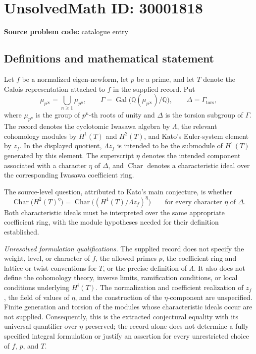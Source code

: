 \documentclass[11pt]{article}
\newcommand{\Q}{\mathbb{Q}}
\begin{document}
\section*{UnsolvedMath ID: 30001818}
\textbf{Source problem code:} catalogue entry
\subsection{Definitions and mathematical statement}
Let \(f\) be a normalized eigen-newform, let \(p\) be a prime, and let \(T\) denote the Galois representation attached to \(f\) in the supplied record. Put
\[
\mu_{p^\infty}=\bigcup_{n\geq 1}\mu_{p^n},\qquad
\Gamma=\operatorname{Gal}\bigl(\Q(\mu_{p^\infty})/\Q\bigr),\qquad
\Delta=\Gamma_{\mathrm{tors}},
\]
where \(\mu_{p^n}\) is the group of \(p^n\)-th roots of unity and \(\Delta\) is the torsion subgroup of \(\Gamma\). The record denotes the cyclotomic Iwasawa algebra by \(\Lambda\), the relevant cohomology modules by \(H^1(T)\) and \(H^2(T)\), and Kato's Euler-system element by \(z_f\). In the displayed quotient, \(\Lambda z_f\) is intended to be the submodule of \(H^1(T)\) generated by this element. The superscript \(\eta\) denotes the intended component associated with a character \(\eta\) of \(\Delta\), and \(\operatorname{Char}\) denotes a characteristic ideal over the corresponding Iwasawa coefficient ring.

The source-level question, attributed to Kato's main conjecture, is whether
\[
\operatorname{Char}\bigl(H^2(T)^\eta\bigr)
=
\operatorname{Char}\bigl((H^1(T)/\Lambda z_f)^\eta\bigr)
\qquad\text{for every character }\eta\text{ of }\Delta.
\]
Both characteristic ideals must be interpreted over the same appropriate coefficient ring, with the module hypotheses needed for their definition established.

\emph{Unresolved formulation qualifications.} The supplied record does not specify the weight, level, or character of \(f\), the allowed primes \(p\), the coefficient ring and lattice or twist conventions for \(T\), or the precise definition of \(\Lambda\). It also does not define the cohomology theory, inverse limits, ramification conditions, or local conditions underlying \(H^i(T)\). The normalization and coefficient realization of \(z_f\), the field of values of \(\eta\), and the construction of the \(\eta\)-component are unspecified. Finite generation and torsion of the modules whose characteristic ideals occur are not supplied. Consequently, this is the extracted conjectural equality with its universal quantifier over \(\eta\) preserved; the record alone does not determine a fully specified integral formulation or justify an assertion for every unrestricted choice of \(f\), \(p\), and \(T\).
\end{document}
